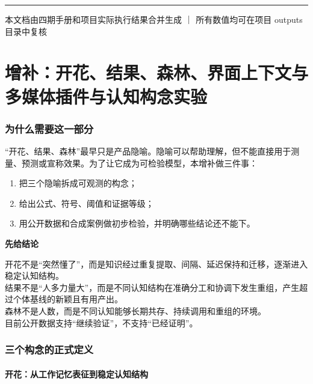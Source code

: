\documentclass[UTF8,a4paper,11pt]{ctexart}
\newenvironment{explainbox}[1]
{\begin{center}\begin{minipage}{0.94\textwidth}\colorbox{boxbg}{\parbox{0.92\textwidth}{\textbf{#1}\par\vspace{2pt}}}}
{\end{minipage}\end{center}}
\begin{document}
\vspace{12pt}
\hrule
\vspace{6pt}
\begin{center}
\small 本文档由四期手册和项目实际执行结果合并生成 ｜
所有数值均可在项目 outputs 目录中复核
\end{center}





\part{增补：开花、结果、森林、界面上下文与多媒体插件与认知构念实验}

\section{为什么需要这一部分}

“开花、结果、森林”最早只是产品隐喻。隐喻可以帮助理解，但不能直接用于测量、预测或宣称效果。为了让它成为可检验模型，本增补做三件事：

\begin{enumerate}[leftmargin=2em]
\item 把三个隐喻拆成可观测的构念；
\item 给出公式、符号、阈值和证据等级；
\item 用公开数据和合成案例做初步检验，并明确哪些结论还不能下。
\end{enumerate}

\begin{explainbox}{先给结论}
开花不是“突然懂了”，而是知识经过重复提取、间隔、延迟保持和迁移，逐渐进入稳定认知结构。\\
结果不是“人多力量大”，而是不同认知结构在准确分工和协调下发生重组，产生超过个体基线的新颖且有用产出。\\
森林不是人数，而是不同认知能够长期共存、持续调用和重组的环境。\\
目前公开数据支持“继续验证”，不支持“已经证明”。
\end{explainbox}

\section{三个构念的正式定义}

\subsection{开花：从工作记忆表征到稳定认知结构}
\end{document}
